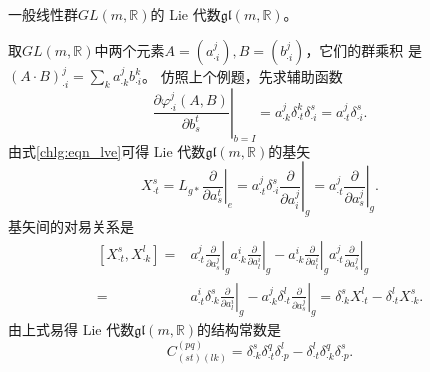 \begin{example}\label{chlg:exam_GL-la}
    一般线性群$GL(m,\mathbb{R})$的 Lie 代数$\mathfrak{gl}(m,\mathbb{R})$。
\end{example}
取$GL(m,\mathbb{R})$中两个元素$A=(a^j_{\cdot i}), B=(b^j_{\cdot i})$，它们的群乘积
是$(A\cdot B)^{j}_{\cdot i} = \sum_{k} a^j_{\cdot k} b^k_{\cdot i}$。
仿照上个例题，先求辅助函数
\begin{equation}
    \left. \frac{\partial \varphi^{j}_{\cdot i} (A,B)}{\partial b_{s}^t}\right|_{b=I} = 
    a^j_{\cdot k} \delta^k_{\cdot t} \delta^s_{\cdot i}=a^j_{\cdot t} \delta^s_{\cdot i}.
\end{equation}
由式\eqref{chlg:eqn_lve}可得 Lie 代数$\mathfrak{gl}(m,\mathbb{R})$的基矢
\begin{equation}
    X_{\cdot t}^s=L_{g*} \left.\frac{\partial }{\partial a_{s}^t}\right|_{e} 
    =a^j_{\cdot t} \delta^s_{\cdot i} \left.\frac{\partial }{\partial a_{i}^j}\right|_{g}
    =a^j_{\cdot t} \left.\frac{\partial }{\partial a_{s}^j}\right|_{g} .
\end{equation}
基矢间的对易关系是
\begin{equation}
\begin{aligned}
    [X_{\cdot t}^s, X_{\cdot k}^l]=&a^j_{\cdot t} \left.\frac{\partial }{\partial a_{s}^j}\right|_{g}
      a^i_{\cdot k} \left.\frac{\partial }{\partial a_{l}^i}\right|_{g}
    - a^i_{\cdot k} \left.\frac{\partial }{\partial a_{l}^i}\right|_{g}
      a^j_{\cdot t} \left.\frac{\partial }{\partial a_{s}^j}\right|_{g} \\
    =&a^i_{\cdot t} \delta^s_{\cdot k} \left.\frac{\partial }{\partial a_{l}^i}\right|_{g}
    - a^j_{\cdot k} \delta^l_{\cdot t} \left.\frac{\partial }{\partial a_{s}^j}\right|_{g} 
    =\delta^s_{\cdot k} X^l_{\cdot t} -\delta^l_{\cdot t} X^s_{\cdot k} .
\end{aligned}\end{equation}
由上式易得 Lie 代数$\mathfrak{gl}(m,\mathbb{R})$的结构常数是
\begin{equation}\label{chlg:eqn_gl-sc}
    C^{(pq)}_{(st)(lk)}= \delta^s_{\cdot k} \delta^q_{\cdot t} \delta^l_{\cdot p}
      -\delta^l_{\cdot t} \delta^q_{\cdot k} \delta^s_{\cdot p} .
\end{equation}




